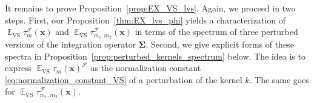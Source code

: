 \documentclass[twoside,11pt]{book}
\DeclareMathOperator{\Det}{Det}
\DeclareMathOperator{\VS}{\mathrm{VS}}
\DeclareMathOperator{\Tran}{\intercal}
\DeclareMathOperator{\EX}{\mathbb{E}}
\DeclareMathOperator{\F}{\mathcal{F}}
\newcommand{\rb}[1]{\textcolor{magenta}{#1}}
\begin{document}
It remains to prove Proposition~\ref{prop:EX_VS_lvs}. Again, we proceed in two steps. First, our Proposition~\ref{thm:EX_lvs_phi} yields a characterization of $ \EX_{\VS}\tau_{m}^{\F}(\bm{x})$ and $\EX_{\VS}\tau_{m_{1},m_{2}}^{\F}(\bm{x})$ in terms of the spectrum of three perturbed versions of the integration operator $\bm{\Sigma}$. Second, we give explicit forms of these spectra in Proposition~\ref{prop:perturbed_kernels_spectrum} below. The idea is to express $\EX_{\VS} \tau_{m}(\bm{x})^{\F}$ as the normalization constant \eqref{eq:normalization_constant_VS} of a perturbation of the kernel $k$.
The same goes for $\EX_{\VS} \tau_{m_{1},m_{2}}^{\F}(\bm{x})$.
\end{document}
